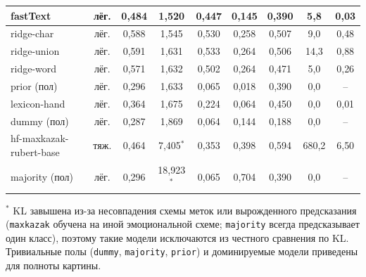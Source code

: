 \documentclass[12pt,a4paper]{report}
\begin{document}
\begin{table}[H]
{\begin{tabular}{|p{3.3cm}|c|c|c|c|c|c|c|c|}
    \hline
    fastText & лёг. & 0{,}484 & 1{,}520 & 0{,}447 & 0{,}145 & 0{,}390 & 5{,}8 & 0{,}03 \\
    \hline
    ridge-char & лёг. & 0{,}588 & 1{,}545 & 0{,}530 & 0{,}258 & 0{,}507 & 9{,}0 & 0{,}48 \\
    \hline
    ridge-union & лёг. & 0{,}591 & 1{,}631 & 0{,}533 & 0{,}264 & 0{,}506 & 14{,}3 & 0{,}88 \\
    \hline
    ridge-word & лёг. & 0{,}571 & 1{,}632 & 0{,}502 & 0{,}264 & 0{,}471 & 5{,}0 & 0{,}26 \\
    \hline
    prior (пол) & лёг. & 0{,}296 & 1{,}633 & 0{,}065 & 0{,}018 & 0{,}390 & 0{,}0 & -- \\
    \hline
    lexicon-hand & лёг. & 0{,}364 & 1{,}675 & 0{,}224 & 0{,}064 & 0{,}450 & 0{,}0 & 0{,}01 \\
    \hline
    dummy (пол) & лёг. & 0{,}287 & 1{,}869 & 0{,}064 & 0{,}144 & 0{,}188 & 0{,}0 & -- \\
    \hline
    hf-maxkazak-rubert-base & тяж. & 0{,}464 & 7{,}405\(^{*}\) & 0{,}353 & 0{,}398 & 0{,}594 & 680{,}2 & 6{,}50 \\
    \hline
    majority (пол) & лёг. & 0{,}296 & 18{,}923\(^{*}\) & 0{,}065 & 0{,}704 & 0{,}390 & 0{,}0 & -- \\
    \hline
  \end{tabular}
  }

  {\scriptsize \(^{*}\) KL завышена из-за несовпадения схемы меток или вырожденного предсказания (\texttt{maxkazak} обучена на иной эмоциональной схеме; \texttt{majority} всегда предсказывает один класс), поэтому такие модели исключаются из честного сравнения по KL. Тривиальные полы (\texttt{dummy}, \texttt{majority}, \texttt{prior}) и доминируемые модели приведены для полноты картины.}
\end{table}
\end{document}

